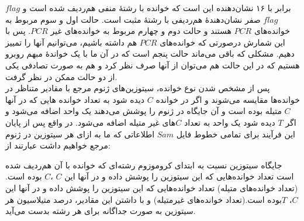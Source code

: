 $flag$ برابر با ۱۶ نشان‌دهنده این است که خوانده با رشتهٔ منفی هم‌ردیف شده است و $flag$ صفر نشان‌دهندهٔ هم‌ردیفی با رشتهٔ مثبت است. حالت اول و سوم مربوط به خوانده‌های $PCR$ هستند و حالت دوم و چهارم مربوط به خوانده‌های غیر $PCR$. پس با این شمارش درصورتی که خوانده‌های $PCR$ هم داشته باشیم، می‌توانیم آنها را تمییز دهیم. مشکلی که باقی می‌ماند حالت پنجم است که در آن ما با یک خواندهٔ مبهم روبرو هستیم که در این حالت هم می‌توان از آنها صرف نظر کرد و هم به صورت تصادفی یکی از دو حالت ممکن در نظر گرفت.
\\
پس از مشخص شدن نوع خوانده، سیتوزین‌های ژنوم مرجع با مقادیر متناظر در خوانده‌ها مقایسه می‌شوند و اگر در خوانده $C$ دیده شود به تعداد خوانده هایی که در آنها $C$ متیله بوده است و آن جایگاه در ژنوم را پوشش می‌دهند یک واحد اضافه می‌شود و اگر $T$ دیده شود یک واحد به تعداد $C$های غیر متیله اضافه می‌شود. در واقع پس از پایان این فرآیند برای تمامی خطوط فایل $Sam$ اطلاعاتی که ما به ازای هر سیتوزین در ژنوم مرجع خواهیم داشت عبارتند از:

 جایگاه سیتوزین نسبت به ابتدای کروموزوم
 رشته‌ای که خوانده با آن هم‌ردیف شده است 
 تعداد خوانده‌هایی که این سیتوزین را پوشش داده و در آنها این $C$ ،$C$ بوده است. (تعداد خوانده‌های متیله)
 تعداد خوانده‌هایی که این سیتوزین را پوشش داده و در آنها این $C$، $T$بوده است.(تعداد خوانده‌های غیرمتیله)
و با داشتن این مقادیر، درصد متیلاسیون هر سیتوزین به صورت جداگانه برای هر رشته بدست می‌آید.


